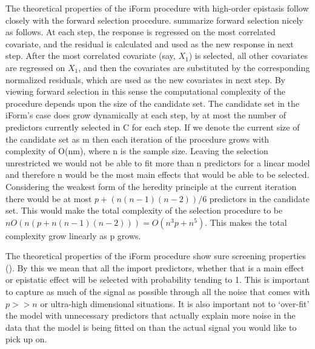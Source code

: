 \documentclass[]{book}
\theoremstyle{definition}
\theoremstyle{definition}
\theoremstyle{remark}
\begin{document}
The theoretical properties of the iForm procedure with high-order
epistasis follow closely with the forward selection procedure.
\cite{hao2014interaction} summarize forward selection nicely as follows.
At each step, the response is regressed on the most correlated
covariate, and the residual is calculated and used as the new response
in next step. After the most correlated covariate (say, \(X_1\)) is
selected, all other covariates are regressed on \(X_1\), and then the
covariates are substituted by the corresponding normalized residuals,
which are used as the new covariates in next step. By viewing forward
selection in this sense the computational complexity of the procedure
depends upon the size of the candidate set. The candidate set in the
iForm's case does grow dynamically at each step, by at most the number
of predictors currently selected in C for each step. If we denote the
current size of the candidate set as m then each iteration of the
procedure grows with complexity of O(nm), where n is the sample size.
Leaving the selection unrestricted we would not be able to fit more than
n predictors for a linear model and therefore n would be the most main
effects that would be able to be selected. Considering the weakest form
of the heredity principle at the current iteration there would be at
most \(p+(n(n-1)(n-2))/6\) predictors in the candidate set. This would
make the total complexity of the selection procedure to be
\(nO(n(p+n(n-1)(n-2)))=O(n^3 p+n^5 )\). This makes the total complexity
grow linearly as p grows.

The theoretical properties of the iForm procedure show sure screening
properties (\cite{fan2008sure}). By this we mean that all the import
predictors, whether that is a main effect or epistatic effect will be
selected with probability tending to 1. This is important to capture as
much of the signal as possible through all the noise that comes with
\(p >> n\) or ultra-high dimensional situations. It is also important
not to `over-fit' the model with unnecessary predictors that actually
explain more noise in the data that the model is being fitted on than
the actual signal you would like to pick up on.
\end{document}
